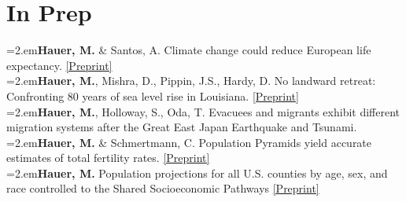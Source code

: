 \section{In Prep}

  \hangindent=2.em\textbf{Hauer, M.} \& Santos, A. Climate change could reduce European life expectancy. \href{https://osf.io/preprints/socarxiv/ngtxr}{[Preprint]}\\  
  
    \hangindent=2.em\textbf{Hauer, M.}, Mishra, D., Pippin, J.S., Hardy, D. No landward retreat: Confronting 80 years of sea level rise in Louisiana. \href{https://osf.io/preprints/socarxiv/n7pt5}{[Preprint]}\\
    
    \hangindent=2.em\textbf{Hauer, M.}, Holloway, S., Oda, T. Evacuees and migrants exhibit different migration systems after the Great East Japan Earthquake and Tsunami.\\
    
    \hangindent=2.em\textbf{Hauer, M.} \& Schmertmann, C. Population Pyramids yield accurate estimates of total fertility rates. \href{https://osf.io/preprints/socarxiv/2f3v6}{[Preprint]}\\
    
    \hangindent=2.em\textbf{Hauer, M.} Population projections for all U.S. counties by age, sex, and race controlled to the Shared Socioeconomic Pathways \href{https://github.com/mathewhauer/county_projections_official/blob/master/maintext.pdf}{[Preprint]}\\
    
 
    
  
    




